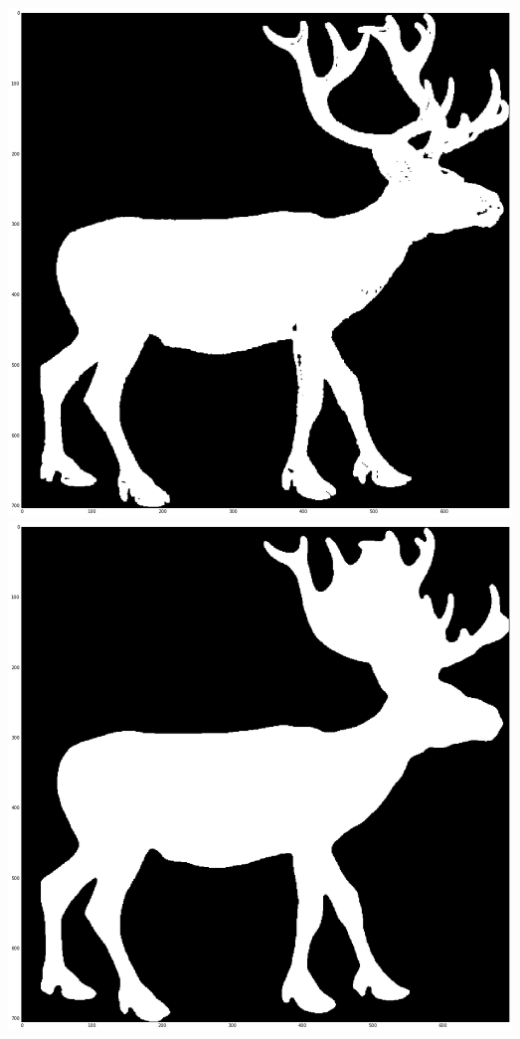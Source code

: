 \documentclass[12pt]{article}
\begin{document}
\includegraphics[scale=0.20]{deer_no_processing.png}
\includegraphics[scale=0.20]{deer_with_processing.png}
          
\end{document}
